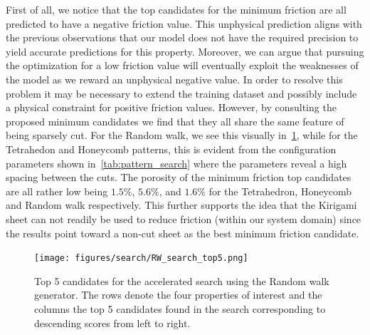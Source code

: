 First of all, we notice that the top candidates for the minimum friction are all
predicted to have a negative friction value. This unphysical prediction aligns
with the previous observations that our model does not have the required
precision to yield accurate predictions for this property. Moreover, we can
argue that pursuing the optimization for a low friction value will eventually
exploit the weaknesses of the model as we reward an unphysical negative value.
In order to resolve this problem it may be necessary to extend the training
dataset and possibly include a physical constraint for positive friction values.
However, by consulting the proposed minimum candidates we find that they all
share the same feature of being sparsely cut. For the Random walk, we see this
visually in~\cref{fig:RW_search_top5}, while for the Tetrahedon and Honeycomb
patterns, this is evident from the configuration parameters shown
in~\cref{tab:pattern_search} where the parameters reveal a high spacing between
the cuts. The porosity of the minimum friction top candidates are all rather low
being $1.5\%$, $5.6\%$, and $1.6\%$ for the Tetrahedron, Honeycomb and Random
walk respectively. This further supports the idea that the Kirigami sheet can
not readily be used to reduce friction (within our system domain) since the
results point toward a non-cut sheet as the best minimum friction candidate.


\begin{figure}[!htb]
  \centering
  \texttt{[image: figures/search/RW\_search\_top5.png]}
  \caption{Top 5 candidates for the accelerated search using the Random walk generator. The rows denote the four properties of interest and the columns the top 5 candidates found in the search corresponding to descending scores from left to right. }
  \label{fig:RW_search_top5}
\end{figure}  


